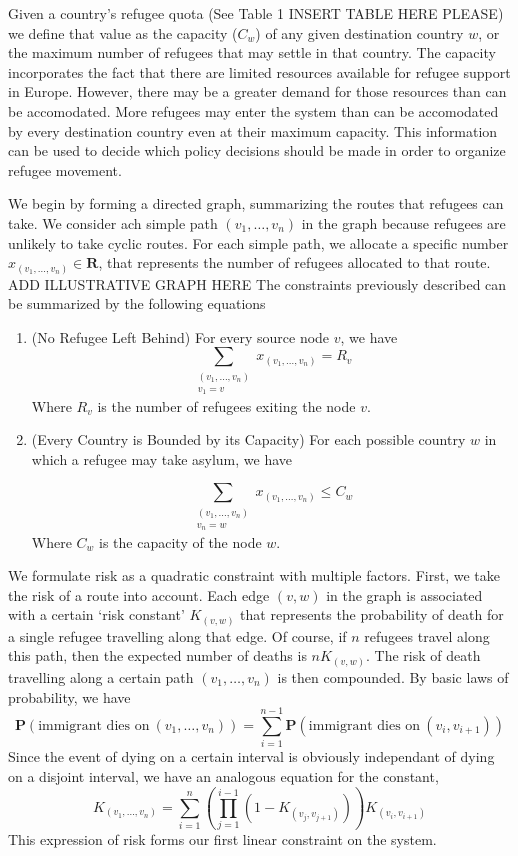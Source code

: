 \documentclass{article}
\begin{document}
Given a country's refugee quota (See Table 1 INSERT TABLE HERE PLEASE) we define that value as the capacity ($C_w$) of any given destination country $w$, or the maximum number of refugees that may settle in that country. The capacity incorporates the fact that there are limited resources available for refugee support in Europe. However, there may be a greater demand for those resources than can be accomodated. More refugees may enter the system than can be accomodated by every destination country even at their maximum capacity. This information can be used to decide which policy decisions should be made in order to organize refugee movement.

We begin by forming a directed graph, summarizing the routes that refugees can take. We consider ach simple path $(v_1, \dots, v_n)$ in the graph because refugees are unlikely to take cyclic routes. For each simple path, we allocate a specific number $x_{(v_1, \dots, v_n)} \in \mathbf{R}$, that represents the number of refugees allocated to that route. ADD ILLUSTRATIVE GRAPH HERE The constraints previously described can be summarized by the following equations

\begin{enumerate}
    \item (No Refugee Left Behind) For every source node $v$, we have
    \[ \sum_{\substack{(v_1, \dots, v_n) \\ v_1 = v}} x_{(v_1, \dots, v_n)} = R_v \]
    Where $R_v$ is the number of refugees exiting the node $v$.

    \item (Every Country is Bounded by its Capacity) For each possible country $w$ in which a refugee may take asylum, we have
    
    \[ \sum_{\substack{(v_1, \dots, v_n) \\ v_n = w}} x_{(v_1, \dots, v_n)} \leq C_w \]
    Where $C_w$ is the capacity of the node $w$.
\end{enumerate}

We formulate risk as a quadratic constraint with multiple factors. First, we take the risk of a route into account. Each edge $(v,w)$ in the graph is associated with a certain `risk constant' $K_{(v,w)}$ that represents the probability of death for a single refugee travelling along that edge. Of course, if $n$ refugees travel along this path, then the expected number of deaths is $n K_{(v,w)}$. The risk of death travelling along a certain path $(v_1, \dots, v_n)$ is then compounded. By basic laws of probability, we have
%
\[ \mathbf{P}(\text{immigrant dies on}\ (v_1, \dots, v_n)) = \sum_{i = 1}^{n-1} \mathbf{P}(\text{immigrant dies on}\ (v_i, v_{i+1})) \]
%
Since the event of dying on a certain interval is obviously independant of dying on a disjoint interval, we have an analogous equation for the constant,
%
\[ K_{(v_1, \dots, v_n)} = \sum_{i = 1}^n \left( \prod_{j = 1}^{i-1} \left(1 - K_{(v_j,v_{j+1})} \right) \right) K_{(v_i, v_{i+1})} \]
%
This expression of risk forms our first linear constraint on the system.
\end{document}
